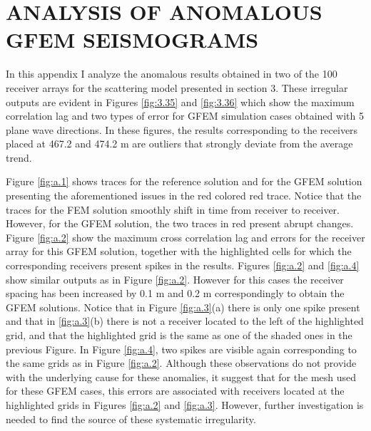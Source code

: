 %
%
%
%

\chapter{\uppercase {Analysis of Anomalous GFEM Seismograms}}
In this appendix I analyze the anomalous results obtained in two of the 100 receiver arrays for the scattering model presented in section 3. These irregular outputs are evident in Figures \ref{fig:3.35} and \ref{fig:3.36} which show the maximum correlation lag and two types of error for GFEM simulation cases obtained with 5 plane wave directions. In these figures, the results corresponding to the receivers placed at 467.2 and 474.2 m  are outliers that  strongly deviate from the average trend. 

Figure \ref{fig:a.1} shows traces for the reference solution and for the GFEM solution presenting the aforementioned issues in the red colored red trace. Notice that the traces for the FEM solution smoothly shift in time from receiver to receiver. However, for the GFEM solution, the two traces in red present abrupt changes.
Figure \ref{fig:a.2} show the maximum cross correlation lag and errors for the receiver array for this GFEM solution, together with the highlighted cells for which the corresponding receivers present spikes in the results.
Figures \ref{fig:a.2} and \ref{fig:a.4} show similar outputs as in Figure \ref{fig:a.2}. However for this cases the receiver spacing has been increased by 0.1 m and 0.2 m correspondingly to obtain the GFEM solutions. Notice that in Figure \ref{fig:a.3}(a) there is only one spike present and that in \ref{fig:a.3}(b) there is not a receiver located to the left of the  highlighted grid,  and that the highlighted grid is the same as one of the shaded ones in the previous Figure. In Figure \ref{fig:a.4}, two spikes are visible again corresponding to the same grids as in Figure \ref{fig:a.2}.
Although these observations do not provide with the underlying cause for these anomalies, it suggest that for the mesh used for these GFEM cases, this errors are associated with receivers located at the highlighted grids in Figures \ref{fig:a.2} and \ref{fig:a.3}. However, further investigation is needed to find the source of these systematic irregularity.


